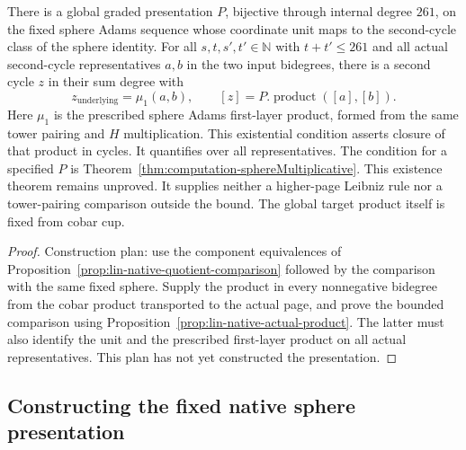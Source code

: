 \begin{theorem}
  \label{thm:bounded-sphere-multiplication}
  \notready
  There is a global graded presentation $P$, bijective through internal
  degree $261$, on the fixed sphere Adams
  sequence whose coordinate unit maps to the second-cycle class of the
  sphere identity. For all $s,t,s',t'\in\mathbb N$ with
  $t+t'\le261$ and all actual second-cycle representatives $a,b$ in
  the two input bidegrees, there is a second cycle $z$ in their sum degree
  with
  \[
    z_{\mathrm{underlying}}=\mu_1(a,b),\qquad
    [z]=P.\operatorname{product}([a],[b]).
  \]
  Here $\mu_1$ is the prescribed sphere Adams first-layer product,
  formed from the same tower pairing and $H$ multiplication.
  This existential condition asserts closure of that product in cycles.
  It quantifies over all representatives. The condition for a specified
  $P$ is Theorem~\ref{thm:computation-sphereMultiplicative}.
  This existence theorem remains unproved. It supplies neither a
  higher-page Leibniz rule nor a tower-pairing comparison outside the
  bound. The global target product itself is fixed from cobar cup.
\end{theorem}

\begin{proof}
  \notready
  Construction plan: use the component equivalences of
  Proposition~\ref{prop:lin-native-quotient-comparison} followed by the
  comparison with the same fixed sphere. Supply the product in every
  nonnegative bidegree from the cobar product transported to the actual
  page, and prove the bounded comparison using
  Proposition~\ref{prop:lin-native-actual-product}. The latter must also
  identify the unit and the prescribed first-layer product on all actual
  representatives. This plan has not yet constructed the presentation.
\end{proof}

\subsection{Constructing the fixed native sphere presentation}
\label{sec:lin-native-presentation-construction}

